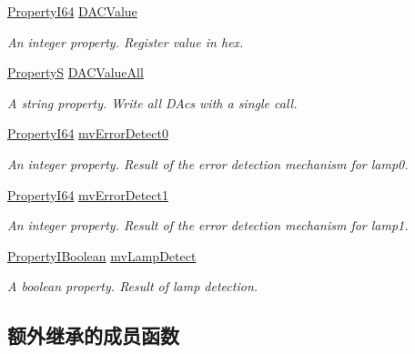\begin{DoxyCompactItemize}
\hyperlink{group___common_interface_ga81749b2696755513663492664a18a893}{Property\+I64} \hyperlink{classmv_i_m_p_a_c_t_1_1acquire_1_1_gen_i_cam_1_1mv_d_a_c_params_aaa35076aa820db48a49a66f6ce36d286}{D\+A\+C\+Value}
\begin{DoxyCompactList}\small\item\em An integer property. Register value in hex. \end{DoxyCompactList}\item 
\hyperlink{classmv_i_m_p_a_c_t_1_1acquire_1_1_property_s}{Property\+S} \hyperlink{classmv_i_m_p_a_c_t_1_1acquire_1_1_gen_i_cam_1_1mv_d_a_c_params_a91bf5b56ea7b94c43455546d427b9e12}{D\+A\+C\+Value\+All}
\begin{DoxyCompactList}\small\item\em A string property. Write all D\+Acs with a single call. \end{DoxyCompactList}\item 
\hyperlink{group___common_interface_ga81749b2696755513663492664a18a893}{Property\+I64} \hyperlink{classmv_i_m_p_a_c_t_1_1acquire_1_1_gen_i_cam_1_1mv_d_a_c_params_a591e04dc62b66075195ba0b63a6d2f7a}{mv\+Error\+Detect0}
\begin{DoxyCompactList}\small\item\em An integer property. Result of the error detection mechanism for lamp0. \end{DoxyCompactList}\item 
\hyperlink{group___common_interface_ga81749b2696755513663492664a18a893}{Property\+I64} \hyperlink{classmv_i_m_p_a_c_t_1_1acquire_1_1_gen_i_cam_1_1mv_d_a_c_params_aa620f0c6c8cae2c33de728a8b6d26b88}{mv\+Error\+Detect1}
\begin{DoxyCompactList}\small\item\em An integer property. Result of the error detection mechanism for lamp1. \end{DoxyCompactList}\item 
\hyperlink{group___common_interface_ga44f9437e24b21b6c93da9039ec6786aa}{Property\+I\+Boolean} \hyperlink{classmv_i_m_p_a_c_t_1_1acquire_1_1_gen_i_cam_1_1mv_d_a_c_params_acf412cf6c8286c85546f8494c7e83362}{mv\+Lamp\+Detect}
\begin{DoxyCompactList}\small\item\em A boolean property. Result of lamp detection. \end{DoxyCompactList}\end{DoxyCompactItemize}
\subsection*{额外继承的成员函数}


